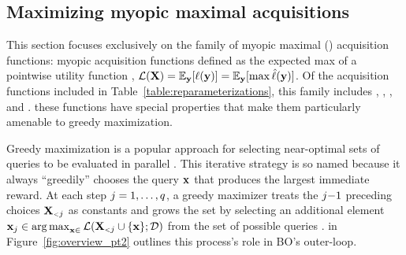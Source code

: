 


\subsection{Maximizing myopic maximal acquisitions}
\label{sect:myopic_maximal}


This section focuses exclusively on the family of myopic maximal (\MM) acquisition functions: myopic acquisition functions defined as the expected max of a pointwise utility function \uacq{}, \ie{} \(\mathcal{L}(\mathbf{X}) = \mathbb{E}_{\mathbf{y}}[\ell(\mathbf{y})] = \mathbb{E}_{\mathbf{y}}[\max \hat{\ell}(\mathbf{y})]\). Of the acquisition functions included in Table~\ref{table:reparameterizations}, this family includes \EI{}, \PI, \SR{}, and \UCB{}.  these functions have special properties that make them particularly amenable to greedy maximization.

Greedy maximization is a popular approach for selecting near-optimal sets of queries \X{} to be evaluated in parallel \cite{azimi2010batch,chen2013near,contal2013parallel,desautels2014parallelizing,shah2015parallel,kathuria2016batched}. This iterative strategy is so named because it always ``greedily'' chooses the query \(\mathbf{x}\) that produces the largest immediate reward. At each step \(j = 1, \ldots, q\), a greedy maximizer treats the \(j{-}1\) preceding choices \(\OLD{1}{\X}\) as constants and grows the set by selecting an additional element \(\NEW{0}{\x} \in \argmax_{\x \in \xspace} \Acq(\OLD{1}{\X} \cup \{\x\}; \data)\) from the set of possible queries \xspace{}.  in Figure~\ref{fig:overview_pt2} outlines this process's role in BO's outer-loop.


